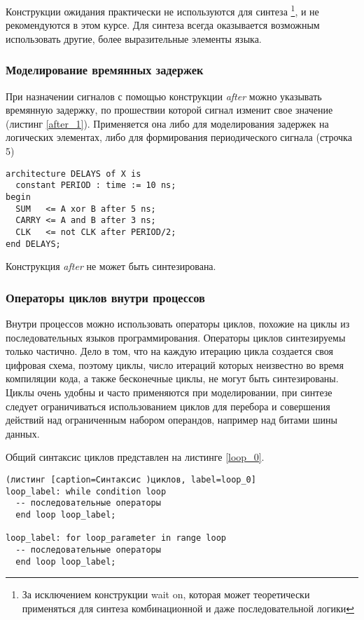 Конструкции ожидания практически не используются для синтеза \footnote{За исключением конструкции wait on, которая может теоретически применяться для синтеза комбинационной и даже последовательной логики}, и не рекомендуются в этом курсе. Для синтеза всегда оказывается возможным использовать другие, более выразительные элементы языка.

\subsubsection{Моделирование времянных задержек}

При назначении сигналов с помощью конструкции \emph{after} можно указывать времянную задержку, по прошествии которой сигнал изменит свое значение (листинг \ref{after_1}). Применяется она либо для моделирования задержек на логических элементах, либо для формирования периодического сигнала (строчка 5)

\begin{Code}
\begin{lstlisting}[caption=Назначение сигналов с задержкой, label=after_1]
architecture DELAYS of X is
  constant PERIOD : time := 10 ns;
begin
  SUM   <= A xor B after 5 ns;
  CARRY <= A and B after 3 ns;
  CLK   <= not CLK after PERIOD/2;
end DELAYS;
\end{lstlisting}
\end{Code}

Конструкция \emph{after} не может быть синтезирована.

\subsubsection{Операторы циклов внутри процессов}

Внутри процессов можно использовать операторы циклов, похожие на циклы из последовательных языков программирования. Операторы циклов синтезируемы только частично. Дело в том, что на каждую итерацию цикла создается своя цифровая схема, поэтому циклы, число итераций которых неизвестно во время компиляции кода, а также бесконечные циклы, не могут быть синтезированы. Циклы очень удобны и часто применяются при моделировании, при синтезе следует ограничиваться использованием циклов для перебора и совершения действий над ограниченным набором операндов, например над битами шины данных.

Общий синтаксис циклов представлен на листинге \ref{loop_0}.

\begin{Code}
\begin{lstlisting}(листинг [caption=Синтаксис )циклов, label=loop_0]
loop_label: while condition loop
  -- последовательные операторы
  end loop loop_label;

loop_label: for loop_parameter in range loop
  -- последовательные операторы
  end loop loop_label;
\end{lstlisting}
\end{Code}

